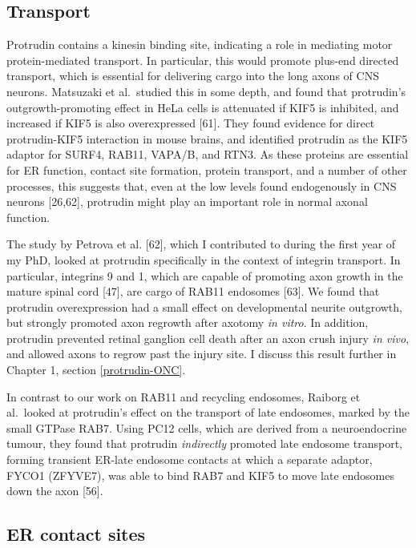 \documentclass[
  12pt,
  a4paper,
]{book}
\begin{document}
\subsection{Transport}\label{intro-ptdn-transport}

Protrudin contains a kinesin binding site, indicating a role in mediating motor protein-mediated transport. In particular, this would promote plus-end directed transport, which is essential for delivering cargo into the long axons of CNS neurons. Matsuzaki et al.~studied this in some depth, and found that protrudin's outgrowth-promoting effect in HeLa cells is attenuated if KIF5 is inhibited, and increased if KIF5 is also overexpressed {[}61{]}. They found evidence for direct protrudin-KIF5 interaction in mouse brains, and identified protrudin as the KIF5 adaptor for SURF4, RAB11, VAPA/B, and RTN3. As these proteins are essential for ER function, contact site formation, protein transport, and a number of other processes, this suggests that, even at the low levels found endogenously in CNS neurons {[}26,62{]}, protrudin might play an important role in normal axonal function.

The study by Petrova et al. {[}62{]}, which I contributed to during the first year of my PhD, looked at protrudin specifically in the context of integrin transport. In particular, integrins \textalpha{}9 and \textbeta{}1, which are capable of promoting axon growth in the mature spinal cord {[}47{]}, are cargo of RAB11 endosomes {[}63{]}. We found that protrudin overexpression had a small effect on developmental neurite outgrowth, but strongly promoted axon regrowth after axotomy \emph{in vitro}. In addition, protrudin prevented retinal ganglion cell death after an axon crush injury \emph{in vivo}, and allowed axons to regrow past the injury site. I discuss this result further in Chapter 1, section \ref{protrudin-ONC}.

In contrast to our work on RAB11 and recycling endosomes, Raiborg et al.~looked at protrudin's effect on the transport of late endosomes, marked by the small GTPase RAB7. Using PC12 cells, which are derived from a neuroendocrine tumour, they found that protrudin \emph{indirectly} promoted late endosome transport, forming transient ER-late endosome contacts at which a separate adaptor, FYCO1 (ZFYVE7), was able to bind RAB7 and KIF5 to move late endosomes down the axon {[}56{]}.

\subsection{ER contact sites}\label{er-contact-sites}
\end{document}
